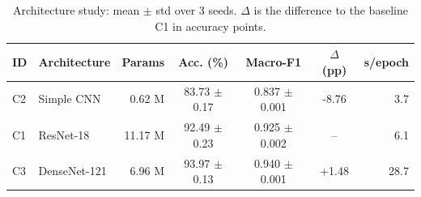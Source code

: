 \begin{table}[t]
\caption{Architecture study: mean $\pm$ std over 3 seeds. $\Delta$ is the difference to the baseline C1 in accuracy points.}
\label{tab:architecture}
\begin{tabular}{llrcccr}
\toprule
ID & Architecture & Params & Acc. (\%) & Macro-F1 & $\Delta$ (pp) & s/epoch \\
\midrule
C2 & Simple CNN & 0.62 M & 83.73 $\pm$ 0.17 & 0.837 $\pm$ 0.001 & -8.76 & 3.7 \\
C1 & ResNet-18 & 11.17 M & 92.49 $\pm$ 0.23 & 0.925 $\pm$ 0.002 & -- & 6.1 \\
C3 & DenseNet-121 & 6.96 M & 93.97 $\pm$ 0.13 & 0.940 $\pm$ 0.001 & +1.48 & 28.7 \\
\bottomrule
\end{tabular}
\end{table}
